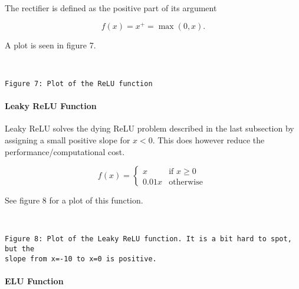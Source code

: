 \documentclass[11pt]{article}
\begin{document}
The rectifier is defined as the positive part of its argument

\[
f(x) = x^{+} = \max(0,x).
\] 

A plot is seen in figure 7.

    \begin{center}
    \end{center}
    { \hspace*{\fill} \\}
    
    \begin{Verbatim}[commandchars=\\\{\}]
Figure 7: Plot of the ReLU function
    \end{Verbatim}

    \hypertarget{leaky-relu-function}{%
\paragraph{Leaky ReLU Function}\label{leaky-relu-function}}

Leaky ReLU solves the dying ReLU problem described in the last
subsection by assigning a small positive slope for \(x < 0\). This does
however reduce the performance/computational cost.

\[
f(x) =
\left\{
    \begin{array}{ll}
        x  & \mbox{if } x \geq 0 \\
        0.01x & \mbox{otherwise }
    \end{array}
\right.
\]

See figure 8 for a plot of this function.

    \begin{center}
    \end{center}
    { \hspace*{\fill} \\}
    
    \begin{Verbatim}[commandchars=\\\{\}]
Figure 8: Plot of the Leaky ReLU function. It is a bit hard to spot, but the
slope from x=-10 to x=0 is positive.
    \end{Verbatim}

    \hypertarget{elu-function}{%
\paragraph{ELU Function}\label{elu-function}}
\end{document}
